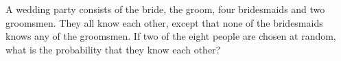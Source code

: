 A wedding party consists of the bride, the groom, four bridesmaids and two groomsmen. They all know each other, except that none of the bridesmaids knows any of the groomsmen. If two of the eight people are chosen at random, what is the probability that they know each other?
